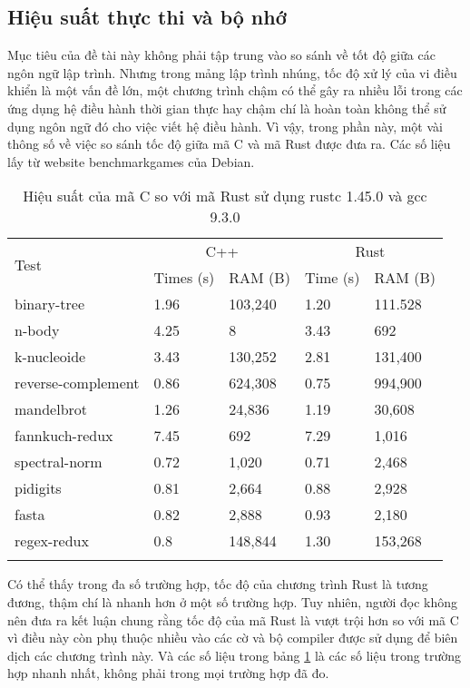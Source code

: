 \subsection{Hiệu suất thực thi và bộ nhớ}\label{lbl:benchmarkgames}
Mục tiêu của đề tài này không phải tập trung vào so sánh về tốt độ giữa các ngôn ngữ lập trình.
Nhưng trong mảng lập trình nhúng, tốc độ xử lý của vi điều khiển là một vấn đề lớn, một chương trình chậm có thể gây ra nhiều lỗi trong các ứng dụng hệ điều hành thời gian thực hay chậm chí là hoàn toàn không thể sử dụng ngôn ngữ đó cho việc viết hệ điều hành.
Vì vậy, trong phần này, một vài thông số về việc so sánh tốc độ giữa mã C và mã Rust được đưa ra.
Các số liệu lấy từ website benchmarkgames của Debian.

\pagebreak
\begin{longtable}{p{} p{} p{} p{} p{}} \toprule
\multirow{2}{0.1\textwidth}{Test} & \multicolumn{2}{c}{C++} & \multicolumn{2}{c}{Rust} \\
\cline{2-5}
& Times (s) & RAM (B) & Time (s) & RAM (B) \\
\midrule
\endhead
binary-tree & 1.96 & 103,240 & 1.20 & 111.528 \\
n-body & 4.25 & 8 & 3.43 & 692 \\
k-nucleoide & 3.43 & 130,252  & 2.81 & 131,400 \\
reverse-complement & 0.86 & 624,308 & 0.75 & 994,900 \\
mandelbrot & 1.26 & 24,836 & 1.19 & 30,608 \\
fannkuch-redux & 7.45 & 692 & 7.29 & 1,016 \\
spectral-norm & 0.72 & 1,020 & 0.71 & 2,468 \\
pidigits & 0.81 & 2,664 & 0.88 & 2,928 \\
fasta & 0.82 & 2,888 & 0.93 & 2,180 \\
regex-redux & 0.8 & 148,844 & 1.30 & 153,268 \\
\bottomrule
\caption{Hiệu suất của mã C so với mã Rust sử dụng rustc 1.45.0 và gcc 9.3.0}
\label{tbl:rust_c_comparison}
\end{longtable}

Có thể thấy trong đa số trường hợp, tốc độ của chương trình Rust là tương đương, thậm chí là nhanh hơn ở một số trường hợp.
Tuy nhiên, người đọc không nên đưa ra kết luận chung rằng tốc độ của mã Rust là vượt trội hơn so với mã C vì điều này còn phụ thuộc nhiều vào các cờ và bộ compiler được sử dụng để biên dịch các chương trình này.
Và các số liệu trong bảng \ref{tbl:rust_c_comparison} là các số liệu trong trường hợp nhanh nhất, không phải trong mọi trường hợp đã đo.

